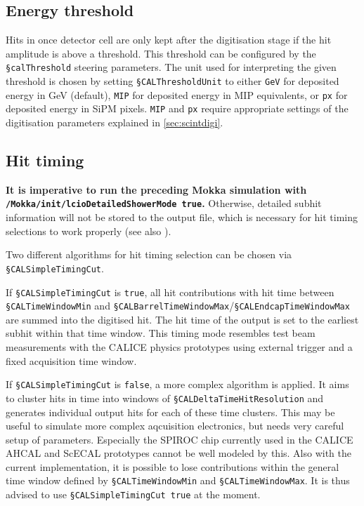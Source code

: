 \documentclass[12pt]{article} %
\begin{document}
\subsection{Energy threshold}
Hits in once detector cell are only kept after the digitisation stage if the hit amplitude is above a threshold. This threshold can be configured by the {\tt \S calThreshold} steering parameters. 
The unit used for interpreting the given threshold is chosen by setting {\tt \S CALThresholdUnit} to either 
{\tt GeV} for deposited energy in GeV (default), 
{\tt MIP} for deposited energy in MIP equivalents, or 
{\tt px} for deposited energy in SiPM pixels. 
{\tt MIP} and {\tt px} require appropriate settings of the digitisation parameters explained in \autoref{sec:scintdigi}.

\subsection{Hit timing}
\textbf{It is imperative to run the preceding Mokka simulation with {\tt /Mokka/init/lcioDetailedShowerMode true}.}
Otherwise, detailed subhit information will not be stored to the output file, which is necessary for hit timing 
selections to work properly (see also \cite{SG_HcalOpt}).

Two different algorithms for hit timing selection can be chosen via {\tt \S CALSimpleTimingCut}.

If {\tt \S CALSimpleTimingCut} is {\tt true}, all hit contributions with hit time between 
{\tt \S CALTimeWindowMin} and {\tt \S CALBarrelTimeWindowMax}/{\tt \S CALEndcapTimeWindowMax} 
are summed into the digitised hit. The hit time of the output is set to the earliest subhit 
within that time window. This timing mode resembles test beam measurements with the CALICE 
physics prototypes using external trigger and a fixed acquisition time window.

If {\tt \S CALSimpleTimingCut} is {\tt false}, a more complex algorithm is applied. 
It aims to cluster hits in time into windows of {\tt \S CALDeltaTimeHitResolution} 
and generates individual output hits for each of these time clusters. This may be useful 
to simulate more complex aqcuisition electronics, but needs very careful setup of parameters. 
Especially the SPIROC chip currently used in the CALICE AHCAL and ScECAL prototypes cannot be well 
modeled by this. Also with the current implementation, it is possible to lose contributions 
within the general time window defined by {\tt \S CALTimeWindowMin} and {\tt \S CALTimeWindowMax}. 
It is thus advised to use {\tt \S CALSimpleTimingCut true} at the moment.
\end{document}
